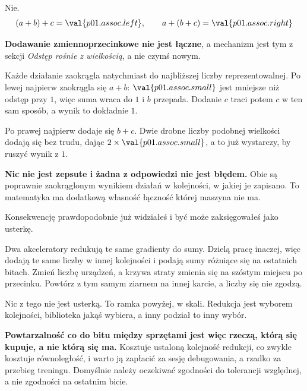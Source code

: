 \begin{fr}
\begin{ansblock}
Nie.
\[ (a + b) + c = \val{p01.assoc.left}, \qquad
   a + (b + c) = \val{p01.assoc.right} \]
\end{ansblock}

\begin{trapbox}
\textbf{Dodawanie zmiennoprzecinkowe nie jest łączne}, a mechanizm jest tym z
sekcji \emph{Odstęp rośnie z wielkością}, a nie czymś nowym.

Każde działanie zaokrągla natychmiast do najbliższej liczby reprezentowalnej.
Po lewej najpierw zaokrągla się $a + b$: $\val{p01.assoc.small}$ jest mniejsze
niż odstęp przy $1$, więc suma wraca do $1$ i $b$ przepada. Dodanie $c$ traci
potem $c$ w ten sam sposób, a wynik to dokładnie $1$.

Po prawej najpierw dodaje się $b + c$. Dwie drobne liczby podobnej wielkości
dodają się bez trudu, dając $2 \times \val{p01.assoc.small}$, a to już
wystarczy, by ruszyć wynik z $1$.

\textbf{Nic nie jest zepsute i żadna z odpowiedzi nie jest błędem.} Obie są
poprawnie zaokrąglonym wynikiem działań w kolejności, w jakiej je zapisano. To
matematyka ma dodatkową własność \dash{} łączność \dash{} której maszyna nie
ma.
\end{trapbox}
\end{fr}

\begin{fr}
Konsekwencję prawdopodobnie już widziałeś i być może zaksięgowałeś jako
usterkę.

Dwa akceleratory redukują te same gradienty do sumy. Dzielą pracę inaczej,
więc dodają te same liczby w innej kolejności i podają sumy różniące się na
ostatnich bitach. Zmień liczbę urządzeń, a krzywa straty zmienia się na
szóstym miejscu po przecinku. Powtórz z tym samym ziarnem na innej karcie, a
liczby się nie zgodzą.

Nic z tego nie jest usterką. To ramka powyżej, w skali. Redukcja jest wyborem
kolejności, biblioteka jakąś wybiera, a inny podział to inny wybór.

\begin{warning}
\textbf{Powtarzalność co do bitu między sprzętami jest więc rzeczą, którą się
kupuje, a nie którą się ma.} Kosztuje ustaloną kolejność redukcji, co zwykle
kosztuje równoległość, i warto ją zapłacić za sesję debugowania, a rzadko za
przebieg treningu. Domyślnie należy oczekiwać zgodności do tolerancji
względnej, a nie zgodności na ostatnim bicie.
\end{warning}
\end{fr}

